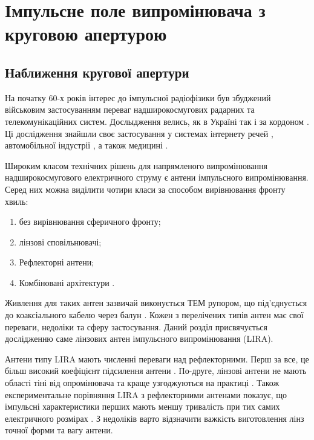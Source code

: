 \chapter{Імпульсне поле випромінювача з круговою апертурою}
\label{ch:linear}

\section{Наближення кругової апертури}

На початку 60-х років інтерес до імпульсної радіофізики був збуджений
військовим застосуванням переваг надширокосмугових радарних та 
телекомунікаційних систем. Дослыдження велись, як в Україні 
\cite{imp:Dumin1996} так і за кордоном \cite{imp:BaumIN0105}. Ці дослідження
знайшли своє застосування у системах інтернету речей \cite{imp:Hartmann2015}, 
автомобільної індустрії \cite{imp:Yarovoy2017}, а також медицині 
\cite{imp:Cho2016}.

Широким класом технічних рішень для напрямленого випромінювання 
надширокосмугового електричного струму є антени імпульсного випромінювання.
Серед них можна виділити чотири класи за способом вирівнювання фронту хвиль:
%
\begin{enumerate}
	\item без вирівнювання сферичного фронту;
	\item лінзові сповільнювачі;
	\item Рефлекторні антени;
	\item Комбіновані архітектури \cite{imp:BaumSSN0379}.
\end{enumerate}

Живлення для таких антен зазвичай виконується ТЕМ рупором, що під'єднується 
до коаксіального кабелю через балун \cite{imp:BaumSSN0357}. Кожен з перелічених 
типів антен має свої переваги, недоліки та сферу застосування. Даний розділ 
присвячується дослідженню саме лінзових антен імпульсного випромінювання (LIRA). 

Антени типу LIRA мають численні переваги над рефлекторними. Перш за все, це
більш високий коефіцієнт підсилення антени \cite{imp:BaumUWBSP1}. По-друге,
лінзові антени не мають області тіні від опромінювача та краще узгоджуються
на практиці \cite{imp:BaumSSN0377}. Також експериментальне порівняння LIRA 
з рефлекторними антенами показує, що імпульсні характеристики перших мають 
меншу тривалість при тих самих електричного розмірах \cite{imp:BaumSSN0377}.
З недоліків варто відзначити важкість виготовлення лінз точної форми та 
вагу антени.


